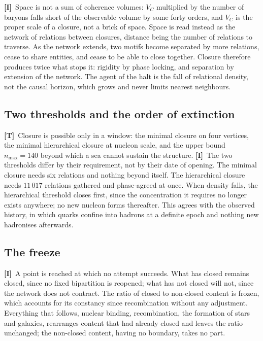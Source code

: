 \documentclass[11pt,a4paper]{article}
\theoremstyle{plain}
\theoremstyle{definition}
\theoremstyle{remark}
\newcommand{\statT}{\textbf{[T]}}
\newcommand{\statI}{\textbf{[I]}}
\begin{document}
\statI\ Space is not a sum of coherence volumes: $V_C$ multiplied by the number of baryons falls short of the observable volume by some forty orders, and $V_C$ is the proper scale of a closure, not a brick of space. Space is read instead as the network of relations between closures, distance being the number of relations to traverse. As the network extends, two motifs become separated by more relations, cease to share entities, and cease to be able to close together. Closure therefore produces twice what stops it: rigidity by phase locking, and separation by extension of the network. The agent of the halt is the fall of relational density, not the causal horizon, which grows and never limits nearest neighbours.

\subsection{Two thresholds and the order of extinction}

\statT\ Closure is possible only in a window: the minimal closure on four vertices, the minimal hierarchical closure at nucleon scale, and the upper bound $n_{\max}=140$ beyond which a sea cannot sustain the structure. \statI\ The two thresholds differ by their requirement, not by their date of opening. The minimal closure needs six relations and nothing beyond itself. The hierarchical closure needs $11\,017$ relations gathered and phase-agreed at once. When density falls, the hierarchical threshold closes first, since the concentration it requires no longer exists anywhere; no new nucleon forms thereafter. This agrees with the observed history, in which quarks confine into hadrons at a definite epoch and nothing new hadronises afterwards.

\subsection{The freeze}

\statI\ A point is reached at which no attempt succeeds. What has closed remains closed, since no fixed bipartition is reopened; what has not closed will not, since the network does not contract. The ratio of closed to non-closed content is frozen, which accounts for its constancy since recombination without any adjustment. Everything that follows, nuclear binding, recombination, the formation of stars and galaxies, rearranges content that had already closed and leaves the ratio unchanged; the non-closed content, having no boundary, takes no part.
\end{document}
